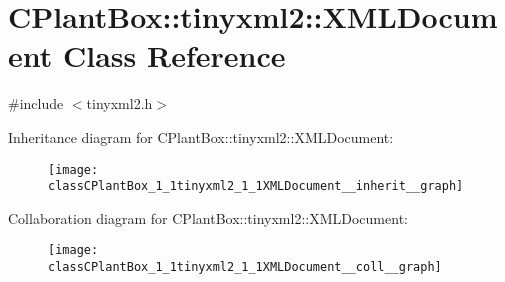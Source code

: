 \hypertarget{classCPlantBox_1_1tinyxml2_1_1XMLDocument}{}\section{C\+Plant\+Box\+:\+:tinyxml2\+:\+:X\+M\+L\+Document Class Reference}
\label{classCPlantBox_1_1tinyxml2_1_1XMLDocument}


{\ttfamily \#include $<$tinyxml2.\+h$>$}



Inheritance diagram for C\+Plant\+Box\+:\+:tinyxml2\+:\+:X\+M\+L\+Document\+:\nopagebreak
\begin{figure}[H]
\begin{center}
\leavevmode
\texttt{[image: classCPlantBox\_1\_1tinyxml2\_1\_1XMLDocument\_\_inherit\_\_graph]}
\end{center}
\end{figure}


Collaboration diagram for C\+Plant\+Box\+:\+:tinyxml2\+:\+:X\+M\+L\+Document\+:\nopagebreak
\begin{figure}[H]
\begin{center}
\leavevmode
\texttt{[image: classCPlantBox\_1\_1tinyxml2\_1\_1XMLDocument\_\_coll\_\_graph]}
\end{center}
\end{figure}
